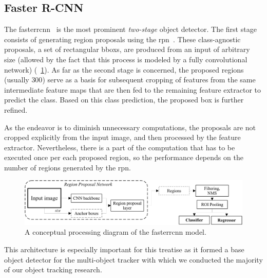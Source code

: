 \subsection{Faster R-CNN}
\label{ssec:FasterRCNN}

The \gls{fasterrcnn}~\cite{ren2017fasterrcnn} is the most prominent \emph{two-stage} object detector. The first stage consists of generating region proposals using the \gls{rpn}~\cite{huang2017speedacctradeoff}. These class-agnostic proposals, a set of rectangular \glspl{bbox}, are produced from an input of arbitrary size (allowed by the fact that this process is modeled by a fully convolutional network) (\figtext{}~\ref{fig:FasterRCNNPipeline}). As far as the second stage is concerned, the proposed regions (usually $300$) serve as a basis for subsequent cropping of features from the same intermediate feature maps that are then fed to the remaining feature extractor to predict the class. Based on this class prediction, the proposed box is further refined.

As the endeavor is to diminish unnecessary computations, the proposals are not cropped explicitly from the input image, and then processed by the feature extractor. Nevertheless, there is a part of the computation that has to be executed once per each proposed region, so the performance depends on the number of regions generated by the \gls{rpn}.

\begin{figure}[t]
    \centerline{\includegraphics[width=\linewidth]{figures/theoretical_foundations/fastercnn_diagram.pdf}}
    \caption[\gls{fasterrcnn}]{A conceptual processing diagram of the \gls{fasterrcnn} model.}
    \label{fig:FasterRCNNPipeline}
\end{figure}

This architecture is especially important for this treatise as it formed a base object detector for the multi-object tracker with which we conducted the majority of our object tracking research.
